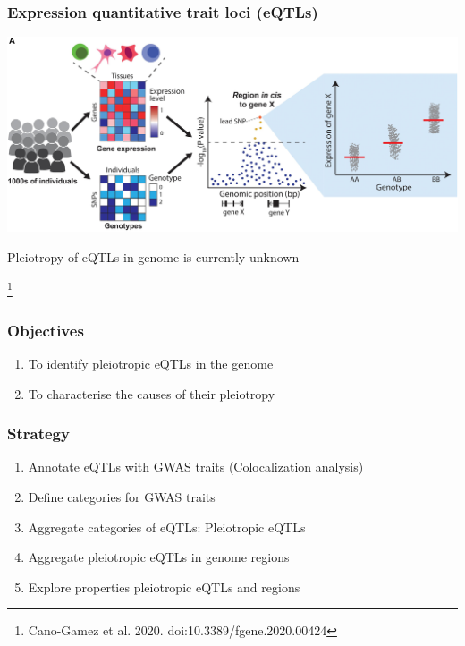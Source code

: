 \documentclass{beamer}
\newcommand\blfootnote[1]{%
    \begingroup
    \renewcommand\thefootnote{}\footnote{#1}%
    \addtocounter{footnote}{-1}%
    \endgroup
}
\begin{document}
    \begin{frame}
        \frametitle{Expression quantitative trait loci (eQTLs)}

        \begin{center}
            \includegraphics[width=\textwidth]{../presentation_230120_gold2022_paris/fig/doi_10.3389_fgene.2020.00424_fig4a.jpg}
        \end{center}
%
        Pleiotropy of eQTLs in genome is currently unknown

        \blfootnote{Cano-Gamez et al. 2020. doi:10.3389/fgene.2020.00424}
    \end{frame}

    \begin{frame}
        \frametitle{Objectives}

        \begin{enumerate}
            \item To identify pleiotropic eQTLs in the genome
            \item To characterise the causes of their pleiotropy
        \end{enumerate}
    \end{frame}

    \begin{frame}
        \frametitle{Strategy}

        \begin{enumerate}
            \item Annotate eQTLs with GWAS traits (Colocalization analysis)
            \item Define categories for GWAS traits
            \item Aggregate categories of eQTLs: Pleiotropic eQTLs
            \item Aggregate pleiotropic eQTLs in genome regions
            \item Explore properties pleiotropic eQTLs and regions
        \end{enumerate}
    \end{frame}
\end{document}
